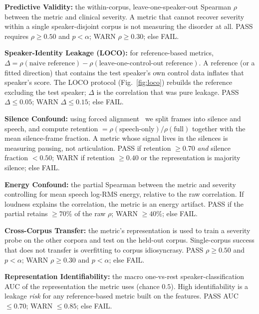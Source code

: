 \documentclass[runningheads]{llncs}
\begin{document}
\textbf{Predictive Validity:} the within-corpus, leave-one-speaker-out Spearman
$\rho$ between the metric and clinical severity. A metric that cannot recover
severity within a single speaker-disjoint corpus is not measuring the disorder at
all. PASS requires $\rho{\ge}0.50$ and $p{<}\alpha$; WARN $\rho{\ge}0.30$; else
FAIL.

\textbf{Speaker-Identity Leakage (LOCO):} for reference-based metrics,
$\Delta = \rho(\text{naive reference}) - \rho(\text{leave-one-control-out
reference})$. A reference (or a fitted direction) that contains the test speaker's
own control data inflates that speaker's score. The LOCO protocol
(Fig.~\ref{fig:loco}) rebuilds the reference excluding the test speaker; $\Delta$
is the correlation that was pure leakage. PASS $\Delta{\le}0.05$; WARN
$\Delta{\le}0.15$; else FAIL.

\textbf{Silence Confound:} using forced alignment~\cite{mcauliffe2017mfa} we split
frames into silence and speech, and compute retention
$=\rho(\text{speech-only})/\rho(\text{full})$ together with the mean silence-frame
fraction. A metric whose signal lives in the silences is measuring pausing, not
articulation. PASS if retention $\ge0.70$ \emph{and} silence fraction $<0.50$;
WARN if retention $\ge0.40$ or the representation is majority silence; else FAIL.

\textbf{Energy Confound:} the partial Spearman between the metric and severity
controlling for mean speech log-RMS energy, relative to the raw correlation. If
loudness explains the correlation, the metric is an energy artifact. PASS if the
partial retains $\ge70\%$ of the raw $\rho$; WARN $\ge40\%$; else FAIL.

\textbf{Cross-Corpus Transfer:} the metric's representation is used to train a
severity probe on the other corpora and test on the held-out corpus. Single-corpus
success that does not transfer is overfitting to corpus idiosyncrasy. PASS
$\rho{\ge}0.50$ and $p{<}\alpha$; WARN $\rho{\ge}0.30$ and $p{<}\alpha$; else FAIL.

\textbf{Representation Identifiability:} the macro one-vs-rest
speaker-classification AUC of the representation the metric uses (chance $0.5$).
High identifiability is a leakage \emph{risk} for any reference-based metric built
on the features. PASS AUC $\le0.70$; WARN $\le0.85$; else FAIL.
\end{document}
